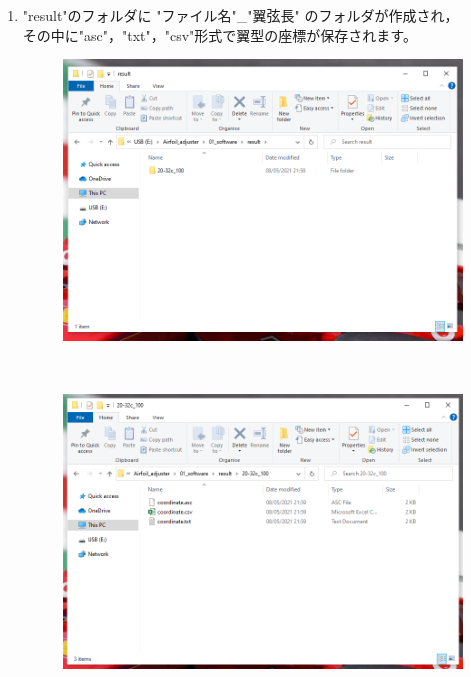 \documentclass[12pt,a4paper]{jsarticle}
\begin{document}
\begin{enumerate}
\begin{figure}[htbp]
\begin{center}
              \end{center}
          \end{figure} \\
    \item "result"のフォルダに "ファイル名"\_"翼弦長" のフォルダが作成され，\\
          その中に"asc"，"txt"，"csv"形式で翼型の座標が保存されます。\\
          \begin{figure}[htbp]
              \begin{center}
                  \includegraphics[width=120mm]{images/image_9.png}
              \end{center}
          \end{figure} \\
          \begin{figure}[htbp]
              \begin{center}
                  \includegraphics[width=120mm]{images/image_10.png}
              \end{center}
          \end{figure} \\
\end{enumerate}
\newpage
\end{document}

